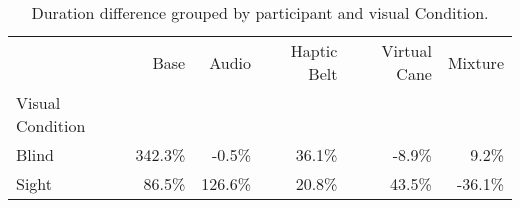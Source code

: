 
\begin{table}[!htb]
\centering
\caption{Duration difference grouped by participant and visual Condition.}
\label{tab:duracao_var_group}
\begin{tabular}{lrrrrr}
\toprule
{} &    Base &   Audio & Haptic Belt & Virtual Cane & Mixture \\
Visual Condition &         &         &             &              &         \\
\midrule
Blind            &  342.3\% &   -0.5\% &       36.1\% &        -8.9\% &    9.2\% \\
Sight            &   86.5\% &  126.6\% &       20.8\% &        43.5\% &  -36.1\% \\
\bottomrule
\end{tabular}
\end{table}

